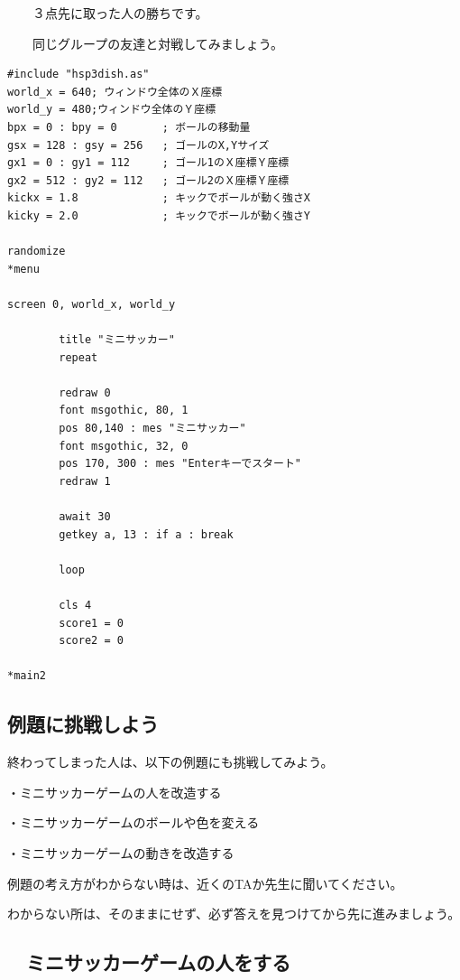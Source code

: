 \documentclass[text04.tex]{subfiles}
\begin{document}
\ \ \ \ ３点先に取った人の勝ちです。

\ \ \ \ 同じグループの友達と対戦してみましょう。



\begin{lstlisting}[caption=ミニサッカーゲームのプログラムの一部]
#include "hsp3dish.as"
world_x = 640; ウィンドウ全体のＸ座標
world_y = 480;ウィンドウ全体のＹ座標
bpx = 0 : bpy = 0       ; ボールの移動量
gsx = 128 : gsy = 256   ; ゴールのX,Yサイズ
gx1 = 0 : gy1 = 112     ; ゴール1のＸ座標Ｙ座標
gx2 = 512 : gy2 = 112   ; ゴール2のＸ座標Ｙ座標
kickx = 1.8             ; キックでボールが動く強さX
kicky = 2.0             ; キックでボールが動く強さY

randomize
*menu

screen 0, world_x, world_y

        title "ミニサッカー"
        repeat

        redraw 0
        font msgothic, 80, 1
        pos 80,140 : mes "ミニサッカー"
        font msgothic, 32, 0
        pos 170, 300 : mes "Enterキーでスタート"
        redraw 1

        await 30
        getkey a, 13 : if a : break

        loop

        cls 4
        score1 = 0
        score2 = 0

*main2
\end{lstlisting}


\newpage
\subsection{例題に挑戦しよう}

終わってしまった人は、以下の例題にも挑戦してみよう。


・ミニサッカーゲームの人を改造する

・ミニサッカーゲームのボールや色を変える

・ミニサッカーゲームの動きを改造する



例題の考え方がわからない時は、近くのTAか先生に聞いてください。

わからない所は、そのままにせず、必ず答えを見つけてから先に進みましょう。
\newpage
\subsection{\useOmetoiExample　ミニサッカーゲームの人をする}
\end{document}
